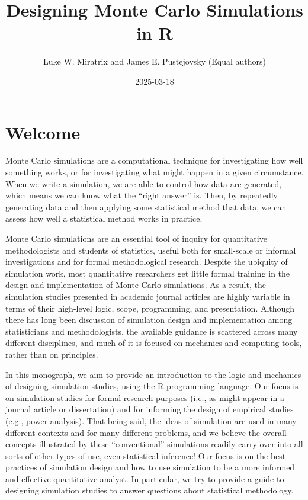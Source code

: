 \documentclass[
]{book}
\title{Designing Monte Carlo Simulations in R}
\author{Luke W. Miratrix and James E. Pustejovsky
(Equal authors)}
\date{2025-03-18}
\begin{document}
\maketitle

{
\setcounter{tocdepth}{1}
\tableofcontents
}
\chapter*{Welcome}\label{welcome}

Monte Carlo simulations are a computational technique for investigating how well something works, or for investigating what might happen in a given circumstance.
When we write a simulation, we are able to control how data are generated, which means we can know what the ``right answer'' is.
Then, by repeatedly generating data and then applying some statistical method that data, we can assess how well a statistical method works in practice.

Monte Carlo simulations are an essential tool of inquiry for quantitative methodologists and students of statistics, useful both for small-scale or informal investigations and for formal methodological research.
Despite the ubiquity of simulation work, most quantitative researchers get little formal training in the design and implementation of Monte Carlo simulations. As a result, the simulation studies presented in academic journal articles are highly variable in terms of their high-level logic, scope, programming, and presentation.
Although there has long been discussion of simulation design and implementation among statisticians and methodologists, the available guidance is scattered across many different disciplines, and much of it is focused on mechanics and computing tools, rather than on principles.

In this monograph, we aim to provide an introduction to the logic and mechanics of designing simulation studies, using the R programming language.
Our focus is on simulation studies for formal research purposes (i.e., as might appear in a journal article or dissertation) and for informing the design of empirical studies (e.g., power analysis).
That being said, the ideas of simulation are used in many different contexts and for many different problems, and we believe the overall concepts illustrated by these ``conventional'' simulations readily carry over into all sorts of other types of use, even statistical inference!
Our focus is on the best practices of simulation design and how to use simulation to be a more informed and effective quantitative analyst.
In particular, we try to provide a guide to designing simulation studies to answer questions about statistical methodology.
\end{document}
